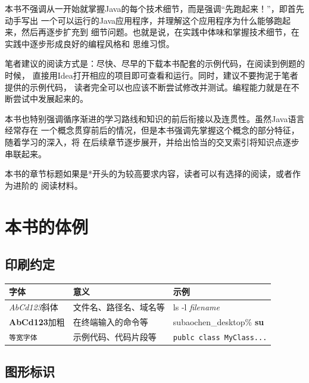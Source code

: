 本书不强调从一开始就掌握Java的每个技术细节，而是强调“先跑起来！”，即首先动手写出
一个可以运行的Java应用程序，并理解这个应用程序为什么能够跑起来，然后再逐步扩充到
细节问题。也就是说，在实践中体味和掌握技术细节，在实践中逐步形成良好的编程风格和
思维习惯。

笔者建议的阅读方式是：尽快、尽早的下载本书配套的示例代码，在阅读到例题的时候，
直接用Idea打开相应的项目即可查看和运行。同时，建议不要拘泥于笔者提供的示例代码，
读者完全可以也应该不断尝试修改并测试。编程能力就是在不断尝试中发展起来的。

本书也特别强调循序渐进的学习路线和知识的前后衔接以及连贯性。虽然Java语言经常存在
一个概念贯穿前后的情况，但是本书强调先掌握这个概念的部分特征，随着学习的深入，将
在后续章节逐步展开，并给出恰当的交叉索引将知识点逐步串联起来。

本书的章节标题如果是*开头的为较高要求内容，读者可以有选择的阅读，或者作为进阶的
阅读材料。


\section*{本书的体例}
\subsection*{印刷约定}
\begin{tabular}{|l|l|l|}
    \hline
    字体 & 意义 & 示例 \\
    \hline
    \textsl{AbCd123}斜体 & 文件名、路径名、域名等 & ls -l \textsl{filename}\\
    \hline
    \textbf{AbCd123}加粗 & 在终端输入的命令等 & subaochen\_desktop\% \textbf{su} \\
    \hline
    \texttt{等宽字体} & 示例代码、代码片段等 & \texttt{publc class MyClass...} \\
    \hline
\end{tabular}

\subsection*{图形标识}

